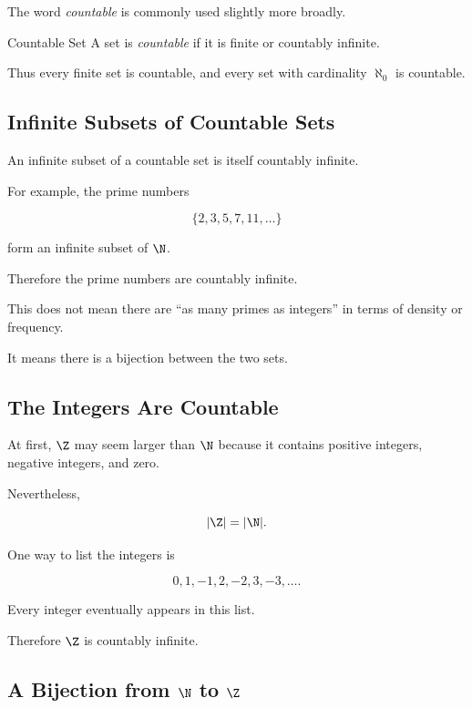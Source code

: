 The word \emph{countable} is commonly used slightly more broadly.

\begin{definitionbox}{Countable Set}
A set is \emph{countable} if it is finite or countably infinite.
\end{definitionbox}

Thus every finite set is countable, and every set with cardinality
\(\aleph_0\) is countable.

\subsection{Infinite Subsets of Countable Sets}
\label{subsec:infinite-subsets-countable}

An infinite subset of a countable set is itself countably infinite.

For example, the prime numbers

\[ \{2,3,5,7,11,\ldots\} \]

form an infinite subset of \(\N\).

Therefore the prime numbers are countably infinite.

This does not mean there are ``as many primes as integers'' in terms of
density or frequency.

It means there is a bijection between the two sets.

\subsection{The Integers Are Countable}
\label{subsec:integers-countable}

At first, \(\Z\) may seem larger than \(\N\) because it contains positive
integers, negative integers, and zero.

Nevertheless,

\[ |\Z|=|\N|. \]

One way to list the integers is

\[ 0,1,-1,2,-2,3,-3,\ldots. \]

Every integer eventually appears in this list.

Therefore \(\Z\) is countably infinite.

\subsection{A Bijection from \(\N\) to \(\Z\)}
\label{subsec:bijection-n-z}

